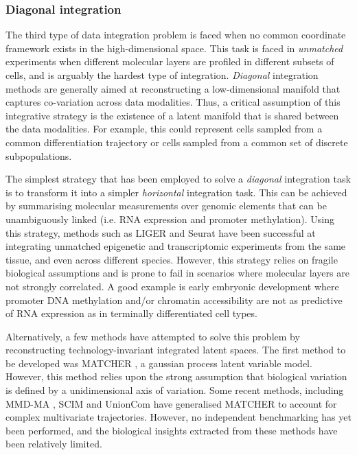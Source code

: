 \subsubsection{Diagonal integration}

The third type of data integration problem is faced when no common coordinate framework exists in the high-dimensional space. This task is faced in \textit{unmatched} experiments when different molecular layers are profiled in different subsets of cells, and is arguably the hardest type of integration. \textit{Diagonal} integration methods are generally aimed at reconstructing a low-dimensional manifold that captures co-variation across data modalities. Thus, a critical assumption of this integrative strategy is the existence of a latent manifold that is shared between the data modalities. For example, this could represent cells sampled from a common differentiation trajectory or cells sampled from a common set of discrete subpopulations.

The simplest strategy that has been employed to solve a \textit{diagonal} integration task is to transform it into a simpler \textit{horizontal} integration task. This can be achieved by summarising molecular measurements over genomic elements that can be unambiguously linked (i.e. RNA expression and promoter methylation). Using this strategy, methods such as LIGER \cite{Welch2019} and Seurat \cite{Stuart2019b} have been successful at integrating unmatched epigenetic and transcriptomic experiments from the same tissue, and even across different species. However, this strategy relies on fragile biological assumptions and is prone to fail in scenarios where molecular layers are not strongly correlated. A good example is early embryonic development where promoter DNA methylation and/or chromatin accessibility are not as predictive of RNA expression \cite{Argelaguet2019} as in terminally differentiated cell types. 

Alternatively, a few methods have attempted to solve this problem by reconstructing technology-invariant integrated latent spaces. The first method to be developed was MATCHER \cite{Welch2017}, a gaussian process latent variable model. However, this method relies upon the strong assumption that biological variation is defined by a unidimensional axis of variation. Some recent methods, including MMD-MA \cite{Liu2019a}, SCIM \cite{Stark2020} and UnionCom \cite{Cao2020} have generalised MATCHER to account for complex multivariate trajectories. However, no independent benchmarking has yet been performed, and the biological insights extracted from these methods have been relatively limited. 


